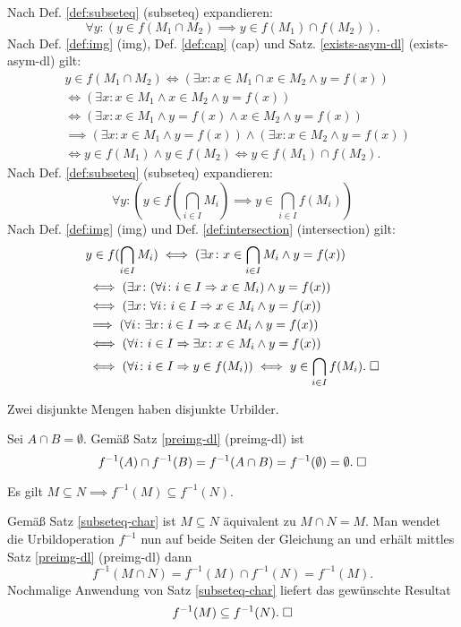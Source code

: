 \begin{Beweis}
Nach Def. \ref{def:subseteq} (subseteq) expandieren:
\[\forall y\colon (y\in f(M_1\cap M_2)\implies y\in f(M_1)\cap f(M_2)).\]
Nach Def. \ref{def:img} (img), Def. \ref{def:cap} (cap)
und Satz. \ref{exists-asym-dl} (exists-asym-dl) gilt:
\begin{align*}
& y\in f(M_1\cap M_2) \iff (\exists x\colon x\in M_1\cap x\in M_2\land y=f(x))\\
&\iff (\exists x\colon x\in M_1\land x\in M_2\land y=f(x))\\
&\iff (\exists x\colon x\in M_1\land y=f(x)\land x\in M_2\land y=f(x))\\
&\implies (\exists x\colon x\in M_1\land y=f(x))\land (\exists x\colon x\in M_2\land y=f(x))\\
&\iff y\in f(M_1)\land y\in f(M_2)\iff y\in f(M_1)\cap f(M_2).
\end{align*}
Nach Def. \ref{def:subseteq} (subseteq) expandieren:
\[\forall y\colon (y\in f(\bigcap_{i\in I} M_i)\implies y\in \bigcap_{i\in I} f(M_i))\]
Nach Def. \ref{def:img} (img) und Def. \ref{def:intersection} (intersection)
gilt:
\begin{align*}
& y\in f(\bigcap_{i\in I} M_i)\iff (\exists x\colon x\in\bigcap_{i\in I} M_i\land y=f(x))\\
& \iff (\exists x\colon (\forall i\colon i\in I\Rightarrow x\in M_i)\land y=f(x))\\
& \iff (\exists x\colon \forall i\colon i\in I\Rightarrow x\in M_i\land y=f(x))\\
& \implies (\forall i\colon\exists x\colon i\in I\Rightarrow x\in M_i\land y=f(x))\\
& \iff (\forall i\colon i\in I\Rightarrow \exists x\colon x\in M_i\land y=f(x))\\
& \iff (\forall i\colon i\in I\Rightarrow y\in f(M_i))
\iff y\in\bigcap_{i\in I} f(M_i).\;\square
\end{align*}
\end{Beweis}

\begin{Korollar}\label{disjoint-preimg}
Zwei disjunkte Mengen haben disjunkte Urbilder.
\end{Korollar}
\begin{Beweis} Sei $A\cap B=\emptyset$. Gemäß Satz
\ref{preimg-dl} (preimg-dl) ist
\[f^{-1}(A)\cap f^{-1}(B) = f^{-1}(A\cap B) = f^{-1}(\emptyset)
= \emptyset.\;\square\]
\end{Beweis}

\begin{Satz}
Es gilt $M\subseteq N\implies f^{-1}(M)\subseteq f^{-1}(N)$.
\end{Satz}
\begin{Beweis}[Beweis\;1]
Gemäß Satz \ref{subseteq-char} ist $M\subseteq N$ äquivalent zu
$M\cap N=M$. Man wendet die Urbildoperation $f^{-1}$ nun auf beide
Seiten der Gleichung an und erhält mittles Satz \ref{preimg-dl}
(preimg-dl) dann%
\[f^{-1}(M\cap N) = f^{-1}(M)\cap f^{-1}(N) = f^{-1}(M).\]
Nochmalige Anwendung von Satz \ref{subseteq-char} liefert
das gewünschte Resultat
\[f^{-1}(M)\subseteq f^{-1}(N).\;\square\]
\end{Beweis}

